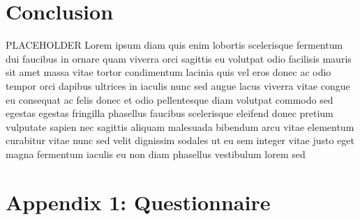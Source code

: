 \documentclass[letterpaper, 10 pt, conference]{ieeeconf}  %
\begin{document}
\section{Conclusion}

PLACEHOLDER Lorem ipsum diam quis enim lobortis scelerisque fermentum dui faucibus in ornare quam viverra orci sagittis eu volutpat odio facilisis mauris sit amet massa vitae tortor condimentum lacinia quis vel eros donec ac odio tempor orci dapibus ultrices in iaculis nunc sed augue lacus viverra vitae congue eu consequat ac felis donec et odio pellentesque diam volutpat commodo sed egestas egestas fringilla phasellus faucibus scelerisque eleifend donec pretium vulputate sapien nec sagittis aliquam malesuada bibendum arcu vitae elementum curabitur vitae nunc sed velit dignissim sodales ut eu sem integer vitae justo eget magna fermentum iaculis eu non diam phasellus vestibulum lorem sed


\addtolength{\textheight}{-12cm}   %







\section*{Appendix 1: Questionnaire}
\end{document}
